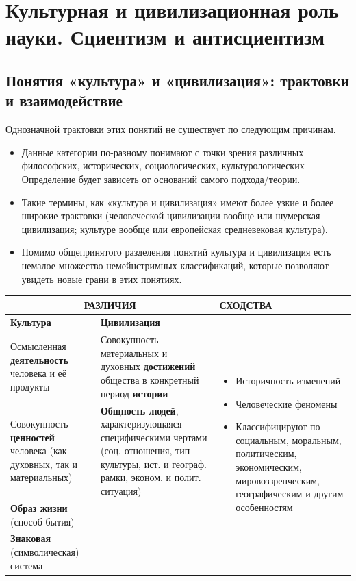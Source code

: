\section{Культурная и цивилизационная роль науки. Сциентизм и антисциентизм}

\subsection{Понятия «культура» и «цивилизация»: трактовки и взаимодействие}

Однозначной трактовки этих понятий не существует по следующим причинам. 
\begin{itemize}
    \item Данные категории по-разному понимают с точки
    зрения различных философских, исторических, социологических, культурологических
    Определение будет зависеть от оснований самого подхода/теории.
    \item Такие термины, как «культура и цивилизация» имеют более узкие и 
    более широкие трактовки (человеческой цивилизации вообще  
    или шумерская цивилизация; культуре вообще или европейская средневековая культура).
    \item Помимо общепринятого разделения понятий культура и цивилизация есть немалое
    множество немейнстримных классификаций, которые позволяют увидеть новые грани 
    в этих понятиях.
\end{itemize}

\begin{table}[H]
\centering
\renewcommand{\arraystretch}{1.5}
\begin{tabular}{|p{4cm}|p{4cm}|p{5cm}|}
\hline
\multicolumn{2}{|c|}{\textbf{РАЗЛИЧИЯ}} & \textbf{СХОДСТВА} \\ \hline
\textbf{Культура} & \textbf{Цивилизация} &
\multirow{5}{4cm}{\begin{itemize}
    \item Историчность изменений
    \item Человеческие феномены
    \item Классифицируют по социальным, моральным, политическим, экономическим, мировоззренческим, географическим и другим особенностям
\end{itemize}} \\ \cline{1-2}
Осмысленная \textbf{деятельность} человека и её продукты &
Совокупность материальных и духовных \textbf{достижений} общества в конкретный период \textbf{истории} & \\ \cline{1-2}
Совокупность \textbf{ценностей} человека (как духовных, так и
материальных) &
\textbf{Общность людей}, характеризующаяся специфическими чертами (соц. отношения, тип культуры, ист. и географ. рамки, эконом. и полит. ситуация) & \\ \cline{1-2}
\textbf{Образ жизни} (способ бытия) &
& \\ \cline{1-2}
\textbf{Знаковая} (символическая) система &
& \\ \hline
\end{tabular}
\label{table:culture_vs_civilization}
\end{table}

